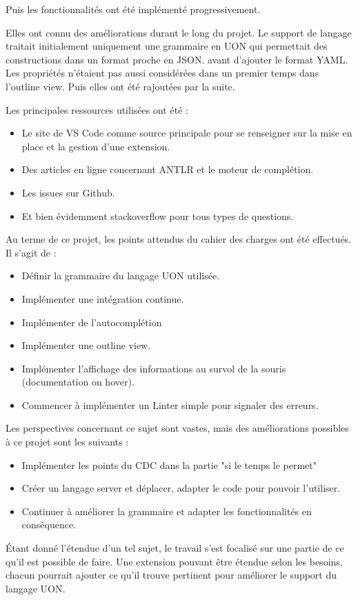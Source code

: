 Puis les fonctionnalités ont été implémenté progressivement.

Elles ont connu des améliorations durant le long du projet.
Le support de langage traitait initialement uniquement une grammaire en UON qui permettait des constructions dans un format proche en JSON.
avant d'ajouter le format YAML.
Les propriétés n'étaient pas aussi considérées dans un premier temps dans l'outline view. Puis elles ont été rajoutées par la suite.

Les principales ressources utilisées ont été :

\begin{itemize}
    \item Le site de VS Code comme source principale pour se renseigner sur la mise en place et la gestion d'une extension.
    \item Des articles en ligne concernant ANTLR et le moteur de complétion.
    \item Les issues sur Github.
    \item Et bien évidemment stackoverflow pour tous types de questions.
\end{itemize}


Au terme de ce projet, les points attendus du cahier des charges ont été effectués. Il s'agit de :
\begin{itemize}
    \item Définir la grammaire du langage UON utilisée.
    \item Implémenter une intégration continue.
    \item Implémenter de l'autocomplétion
    \item Implémenter une outline view.
    \item Implémenter l'affichage des informations au survol de la souris (documentation on hover).
    \item Commencer à implémenter un Linter simple pour signaler des erreurs.
\end{itemize}

Les perspectives concernant ce sujet sont vastes, mais des améliorations possibles à ce projet sont les suivants :
\begin{itemize}
    \item Implémenter les points du CDC dans la partie "si le temps le permet"
    \item Créer un langage server et déplacer, adapter le code pour pouvoir l'utiliser.
    \item Continuer à améliorer la grammaire et adapter les fonctionnalités en conséquence.
\end{itemize}

Étant donné l'étendue d'un tel sujet, le travail s'est focalisé sur une partie de ce qu'il est possible de faire.
Une extension pouvant être étendue selon les besoins, chacun pourrait ajouter ce qu'il trouve pertinent pour améliorer le support du langage UON.

